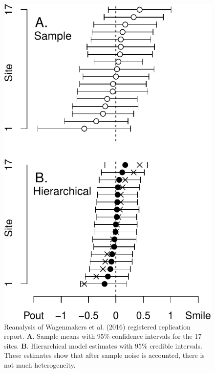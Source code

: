 \documentclass[english,man]{apa6}
\theoremstyle{definition}
\theoremstyle{definition}
\theoremstyle{remark}
\begin{document}
\begin{figure}[htbp]
\centering
\includegraphics{pBlind_files/figure-latex/wagEst-1.pdf}
\caption{\label{fig:wagEst}Reanalysis of Wagenmakers et al. (2016)
registered replication report. \textbf{A}. Sample means with 95\%
confidence intervals for the 17 sites. \textbf{B}. Hierarchical model
estimates with 95\% credible intervals. These estimates show that after
sample noise is accounted, there is not much heterogeneity.}
\end{figure}
\end{document}
